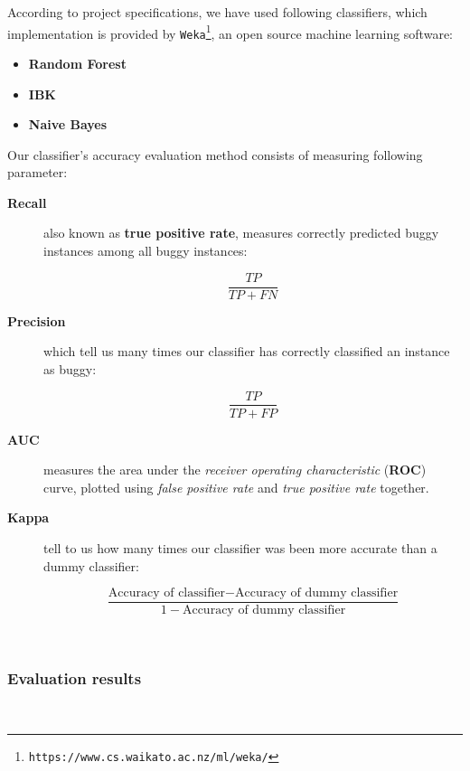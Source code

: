 \documentclass[sigconf]{acmart}
\begin{document}
According to project specifications, we have used following classifiers, which implementation is provided by \texttt{Weka}\footnote{\texttt{https://www.cs.waikato.ac.nz/ml/weka/}}, an open source machine learning software:
\begin{itemize}
\item \textbf{Random Forest}
\item \textbf{IBK}
\item \textbf{Naive Bayes}
\end{itemize}

Our classifier's accuracy evaluation method consists of measuring following parameter:

\begin{description}

\item[\textbf{Recall}] also known as \textbf{true positive rate}, measures correctly predicted buggy instances among all buggy instances:

\begin{equation}
\dfrac{TP}{TP + FN}
\end{equation}

\item[\textbf{Precision}] which tell us many times our classifier has correctly classified an instance as buggy:

\begin{equation}
\dfrac{TP}{TP + FP}
\end{equation}

\item[\textbf{AUC}] measures the area under the \textit{receiver operating characteristic} (\textbf{ROC}) curve, plotted using \textit{false positive rate} and \textit{true positive rate} together.

\item[\textbf{Kappa}] tell to us how many times our classifier was been more accurate than a dummy classifier:

\begin{equation}
\dfrac{\text{Accuracy of classifier} - \text{Accuracy of dummy classifier}}{1 - \text{Accuracy of dummy classifier}}
\end{equation}

\end{description}
\hfill\\
\subsubsection{Evaluation results}
\hfill\\
\end{document}
